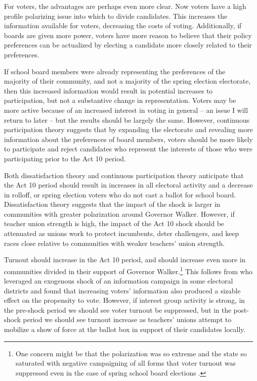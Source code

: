 For voters, the advantages are perhaps even more clear. Now voters have a high 
profile polarizing issue into which to divide candidates. This increases the 
information available for voters, decreasing the costs of voting. Additionally, 
if boards are given more power, voters have more reason to believe that their 
policy preferences can be actualized by electing a candidate more closely related 
to their preferences. 

If school board members were already representing the preferences of the majority 
of their community, and not a majority of the spring election electorate, then 
this increased information would result in potential increases to participation, 
but not a substantive change in representation. Voters may be more active because 
of an increased interest in voting in general -- an issue I will return to later -- 
but the results should be largely the same. However, continuous participation 
theory suggests that by expanding the electorate and revealing more information 
about the preferences of board members, voters should be more likely to participate 
and reject candidates who represent the interests of those who were participating 
prior to the Act 10 period. 

Both dissatisfaction theory and continuous participation theory 
anticipate that the Act 10 period should result in increases in all electoral 
activity and a decrease in rolloff, or spring election voters who do not 
cast a ballot for school board. Dissatisfaction theory suggests that the impact 
of the shock is larger in communities with greater polarization around Governor 
Walker. However, if teacher union strength is high, the impact of the Act 10 
shock should be attenuated as unions work to protect incumbents, deter 
challengers, and keep races close relative to communities with weaker teachers' 
union strength. 

Turnout should increase in the Act 10 period, and should increase even more in 
communities divided in their support of Governor Walker.\footnote{One concern 
might be that the polarization was so extreme and the state so saturated with 
negative campaigning of all forms that voter turnout was suppressed even in the 
case of spring school board elections \citep{NegativeCamp1999}.} This follows from 
\citet{Lassen2005} who leveraged an exogenous shock 
of an information campaign in some electoral districts and found that 
increasing voters' information also produced a sizable effect on the propensity 
to vote. However, if interest group activity is strong, in the pre-shock period 
we should see voter turnout be suppressed, but in the post-shock period we should 
see turnout increase as teachers' unions attempt to mobilize a show of force 
at the ballot box in support of their candidates locally. 

